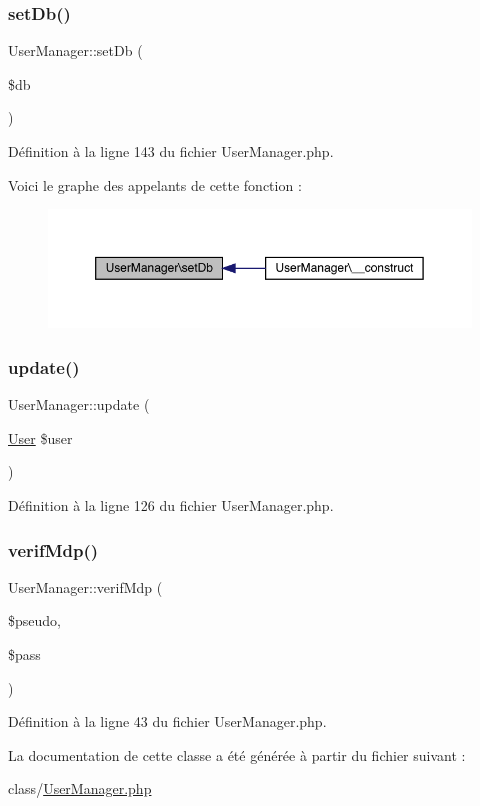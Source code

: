 \subsubsection{\texorpdfstring{set\+Db()}{setDb()}}
{\footnotesize\ttfamily User\+Manager\+::set\+Db (\begin{DoxyParamCaption}\item[{}]{\$db }\end{DoxyParamCaption})}



Définition à la ligne 143 du fichier User\+Manager.\+php.

Voici le graphe des appelants de cette fonction \+:\nopagebreak
\begin{figure}[H]
\begin{center}
\leavevmode
\includegraphics[width=350pt]{class_user_manager_a08370d99527bfd6b2fae2923a7c21acb_icgraph}
\end{center}
\end{figure}
\mbox{\label{class_user_manager_ad953740cf56464fdb81b8bc9654c5371}} 
\subsubsection{\texorpdfstring{update()}{update()}}
{\footnotesize\ttfamily User\+Manager\+::update (\begin{DoxyParamCaption}\item[{\mbox{\hyperlink{class_user}{User}}}]{\$user }\end{DoxyParamCaption})}



Définition à la ligne 126 du fichier User\+Manager.\+php.

\mbox{\label{class_user_manager_acc70ee4bbcbfcf4b0cd7b6733a46128a}} 
\subsubsection{\texorpdfstring{verif\+Mdp()}{verifMdp()}}
{\footnotesize\ttfamily User\+Manager\+::verif\+Mdp (\begin{DoxyParamCaption}\item[{}]{\$pseudo,  }\item[{}]{\$pass }\end{DoxyParamCaption})}



Définition à la ligne 43 du fichier User\+Manager.\+php.



La documentation de cette classe a été générée à partir du fichier suivant \+:\begin{DoxyCompactItemize}
\item 
class/\mbox{\hyperlink{_user_manager_8php}{User\+Manager.\+php}}\end{DoxyCompactItemize}
